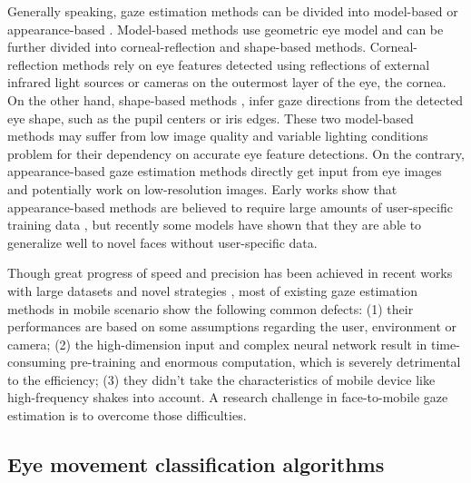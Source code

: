 \documentclass[acmlarge]{acmart}
\begin{document}
Generally speaking, gaze estimation methods can be divided into model-based or appearance-based \cite{hansen2009eye, sugano2015appearance, zhang15_cvpr, zhang17_cvprw, zhang2017mpiigaze, zhang18_etra}. Model-based methods use geometric eye model and can be further divided into corneal-reflection and shape-based methods. Corneal-reflection methods \cite{morimoto2002detecting, shih2004novel, yoo2005novel, hennessey2006single, zhu2005eye, zhu2006nonlinear} rely on eye features detected using reflections of external infrared light sources or cameras on the outermost layer of the eye, the cornea. On the other hand, shape-based methods \cite{zhu2006nonlinear, chen20083d, yamazoe2008remote},  \cite{valenti2011combining} infer gaze directions from the detected eye shape, such as the pupil centers or iris edges.  These two model-based methods may suffer from low image quality and variable lighting conditions problem for their dependency on accurate eye feature detections. On the contrary, appearance-based gaze estimation methods directly get input from eye images and potentially work on low-resolution images. Early works show that appearance-based methods are believed to require large amounts of user-specific training data \cite{zhang2015appearance}, but recently some models \cite{zhang2019evaluation} have shown that they are able to generalize well to novel faces without user-specific data. 

Though great progress of speed and precision has been achieved in recent works with large datasets and novel strategies \cite{krafka2016eye, wong2019gaze, shrivastava2017learning, recasens2018learning}, most of existing gaze estimation methods in mobile scenario show the following common defects: (1) their performances are based on some assumptions regarding the user, environment or camera; (2) the high-dimension input and complex neural network result in time-consuming pre-training and enormous computation, which is severely detrimental to the efficiency; (3) they didn't take the characteristics of mobile device like high-frequency shakes into account. A research challenge in face-to-mobile gaze estimation is to overcome those difficulties.

\subsection{Eye movement classification algorithms}
\end{document}
